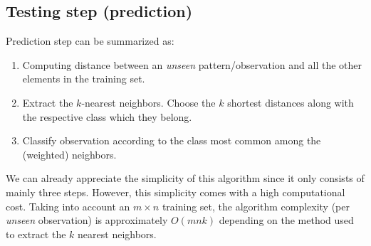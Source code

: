 \subsection{Testing step (prediction)}
Prediction step can be summarized as:
\begin{enumerate}
	\item Computing distance between an \textit{unseen} pattern/observation and all the other elements in the training set.
	\item Extract the $k$-nearest neighbors. Choose the $k$ shortest distances along with the respective class which they belong.
	\item Classify observation according to the class most common among the (weighted) neighbors. 
\end{enumerate}

We can already appreciate the simplicity of this algorithm since it only consists of mainly three steps. However, this simplicity comes with a high computational cost. Taking into account an  $m \times n$ training set, the algorithm complexity (per \textit{unseen} observation) is approximately $O(mnk)$ depending on the method used to extract the $k$ nearest neighbors.